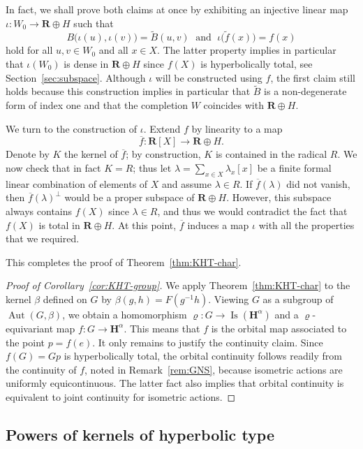 \documentclass[11pt]{article}
\theoremstyle{definition}
\numberwithin{equation}{section}
\numberwithin{figure}{section}
\numberwithin{table}{section}
\newcommand{\sH}{H}
\newcommand{\RR}{\mathbf{R}}
\newcommand{\HH}{\mathbf{H}}
\DeclareMathOperator{\Isom}{Is}
\DeclareMathOperator{\Aut}{Aut}
\newcommand{\inv}{^{-1}}
\newcommand{\ro}{\varrho}
\newcommand{\wt}{\widetilde}
\newcommand{\ol}{\overline}
\begin{document}
In fact, we shall prove both claims at once by exhibiting an injective linear map $\iota\colon W_0 \to \RR\oplus\sH$ such that
\[
B\big(\iota(u), \iota(v)\big) = \wt B(u,v) \; \text{ and }\; \iota\big(\wt f(x)\big) = f(x)
\]
hold for all $u,v\in W_0$ and all $x\in X$. The latter property implies in particular that $\iota(W_0)$ is dense in $\RR\oplus\sH$ since $f(X)$ is hyperbolically total, see Section~\ref{sec:subspace}. Although $\iota$ will be constructed using $f$, the first claim still holds because this construction implies in particular that $\wt B$ is a non-degenerate form of index one and that the completion $W$ coincides with $\RR\oplus\sH$.

We turn to the construction of $\iota$. Extend $f$ by linearity to a map
\[
\ol f\colon\RR[X] \longrightarrow \RR\oplus H.
\]
Denote by $K$ the kernel of $\ol f$; by construction, $K$ is contained in the radical $R$. We now check that in fact $K=R$; thus let $\lambda = \sum_{x\in X} \lambda_x [x]$ be a finite formal linear combination of elements of $X$ and assume $\lambda\in R$. If $\ol f(\lambda)$ did not vanish, then $\ol f(\lambda)^\perp$ would be a proper subspace of $\RR\oplus\sH$. However, this subspace always contains $f(X)$ since $\lambda\in R$, and thus we would contradict the fact that $f(X)$ is total in $\RR\oplus\sH$. At this point, $\ol f$ induces a map $\iota$ with all the properties that we required.

This completes the proof of Theorem~\ref{thm:KHT-char}.%

\begin{proof}[Proof of Corollary~\ref{cor:KHT-group}]
We apply Theorem~\ref{thm:KHT-char} to the kernel $\beta$ defined on $G$ by $\beta(g,h)= F(g\inv h)$. Viewing $G$ as a subgroup of $\Aut(G,\beta)$, we obtain a homomorphism $\ro\colon G\to \Isom(\HH^\alpha)$ and a $\ro$-equivariant map $f\colon G\to \HH^\alpha$. This means that $f$ is the orbital map associated to the point $p=f(e)$. It only remains to justify the continuity claim. Since $f(G)=G p$ is hyperbolically total, the orbital continuity follows readily from the continuity of $f$, noted in Remark~\ref{rem:GNS}, because isometric actions are uniformly equicontinuous. The latter fact also implies that orbital continuity is equivalent to joint continuity for isometric actions.
\end{proof}

\subsection{Powers of kernels of hyperbolic type}
\end{document}
